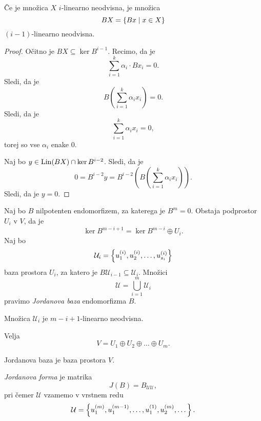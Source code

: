 \documentclass[12pt, a4paper]{article}
\begin{document}
\begin{trditev}
Če je množica $X$ $i$-linearno neodvisna, je množica
\[
BX=\left\{Bx\mid x\in X\right\}
\]
$(i-1)$-linearno neodvisna.
\end{trditev}

\begin{proof}
Očitno je $BX\subseteq\ker B^{i-1}$. Recimo, da je
\[
\sum_{i=1}^k \alpha_i\cdot B x_i = 0.
\]
Sledi, da je
\[
B\left(\sum_{i=1}^k \alpha_ix_i\right)=0.
\]
Sledi, da je
\[
\sum_{i=1}^k \alpha_ix_i=0,
\]
torej so vse $\alpha_i$ enake $0$.

Naj bo $y\in\operatorname{Lin}(BX)\cap\ker B^{i-2}$. Sledi, da je
\[
0=B^{i-2}y=B^{i-2}\left(B\left(\sum_{i=1}^k \alpha_ix_i\right)\right).
\]
Sledi, da je $y=0$.
\end{proof}

\begin{definicija}
Naj bo $B$ nilpotenten endomorfizem, za katerega je $B^m=0$. Obstaja podprostor $U_i$ v $V$, da je
\[
\ker B^{m-i+1}=\ker B^{m-i}\oplus U_i.
\]
Naj bo
\[
\mathcal{U}_i=\left\{u_1^{(i)}, u_2^{(i)},\dots, u_{s_i}^{(i)}\right\}
\]
baza prostora $U_i$, za katero je $B\mathcal{U}_{i-1}\subseteq\mathcal{U}_i$. Množici
\[
\mathcal{U}=\bigcup_{i=1}^m\mathcal{U}_i
\]
pravimo \emph{Jordanova baza} endomorfizma $B$.
\end{definicija}

\begin{opomba}
Množica $\mathcal{U}_i$ je $m-i+1$-linearno neodvisna.
\end{opomba}

\begin{trditev}
Velja
\[
V=U_1\oplus U_2\oplus\dots\oplus U_m.
\]
\end{trditev}

\obvs

\begin{posledica}
Jordanova baza je baza prostora $V$.
\end{posledica}

\begin{definicija}
\emph{Jordanova forma} je matrika
\[
J(B)=B_{\mathcal{UU}},
\]
pri čemer $\mathcal{U}$ vzamemo v vrstnem redu
\[
\mathcal{U}=\left\{u_1^{(m)},u_1^{(m-1)},\dots,u_1^{(1)},u_2^{(m)},\dots\right\}.
\]
\end{definicija}
\end{document}
